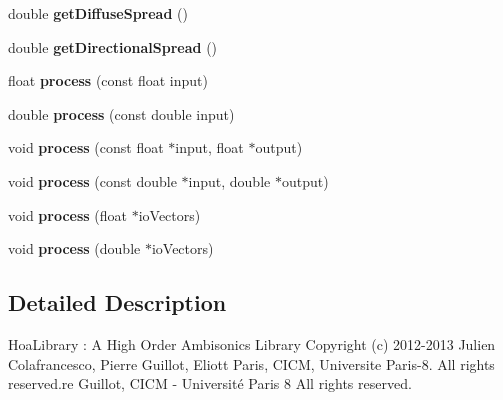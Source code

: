 \begin{DoxyCompactItemize}
\item 
\hypertarget{class_freeverb_a33c754bdd65872535c8a44f499797afb}{double {\bfseries get\-Diffuse\-Spread} ()}\label{class_freeverb_a33c754bdd65872535c8a44f499797afb}

\item 
\hypertarget{class_freeverb_ad27902328f01d5e65c5223e2a1ee213e}{double {\bfseries get\-Directional\-Spread} ()}\label{class_freeverb_ad27902328f01d5e65c5223e2a1ee213e}

\item 
\hypertarget{class_freeverb_a68099ba0e24b9fe23ac422f0386fd383}{float {\bfseries process} (const float input)}\label{class_freeverb_a68099ba0e24b9fe23ac422f0386fd383}

\item 
\hypertarget{class_freeverb_a783cdc98fbd009ee9c6202ab5bd33c22}{double {\bfseries process} (const double input)}\label{class_freeverb_a783cdc98fbd009ee9c6202ab5bd33c22}

\item 
\hypertarget{class_freeverb_a00e5b12b6fa9e1bcbc53c10299e20167}{void {\bfseries process} (const float $\ast$input, float $\ast$output)}\label{class_freeverb_a00e5b12b6fa9e1bcbc53c10299e20167}

\item 
\hypertarget{class_freeverb_aab4d0bcd47a931ac38ab298cc978a19d}{void {\bfseries process} (const double $\ast$input, double $\ast$output)}\label{class_freeverb_aab4d0bcd47a931ac38ab298cc978a19d}

\item 
\hypertarget{class_freeverb_aa60cc11f6269eba0a12ccdd70a785148}{void {\bfseries process} (float $\ast$io\-Vectors)}\label{class_freeverb_aa60cc11f6269eba0a12ccdd70a785148}

\item 
\hypertarget{class_freeverb_a4fc0e61874b9bcb437ffcbee83834e8e}{void {\bfseries process} (double $\ast$io\-Vectors)}\label{class_freeverb_a4fc0e61874b9bcb437ffcbee83834e8e}

\end{DoxyCompactItemize}


\subsection{Detailed Description}
Hoa\-Library \-: A High Order Ambisonics Library Copyright (c) 2012-\/2013 Julien Colafrancesco, Pierre Guillot, Eliott Paris, C\-I\-C\-M, Universite Paris-\/8. All rights reserved.\-re Guillot, C\-I\-C\-M -\/ Université Paris 8 All rights reserved.

